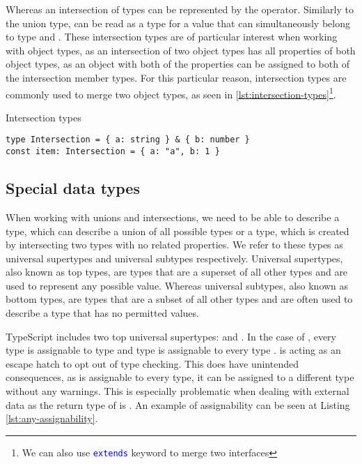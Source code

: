 Whereas an intersection of types can be represented by the \code{&} operator. Similarly to the union type,  can be read as a type for a value that can simultaneously belong to type  and . These intersection types are of particular interest when working with object types, as an intersection of two object types has all properties of both object types, as an object with both of the properties can be assigned to both of the intersection member types. For this particular reason, intersection types are commonly used to merge two object types, as seen in \ref{lst:intersection-types}\footnote{We can also use \texttt{\textcolor{blue}{extends}} keyword to merge two interfaces}.

\begin{listing}[h]
  \caption{Intersection types}\label{lst:intersection-types}
  \begin{verbatim}
type Intersection = { a: string } & { b: number }
const item: Intersection = { a: "a", b: 1 }
  \end{verbatim}
\end{listing}

\subsection{Special data types}

When working with unions and intersections, we need to be able to describe a type, which can describe a union of all possible types or a type, which is created by intersecting two types with no related properties. We refer to these types as universal supertypes and universal subtypes respectively. Universal supertypes, also known as top types, are types that are a superset of all other types and are used to represent any possible value. Whereas universal subtypes, also known as bottom types, are types that are a subset of all other types and are often used to describe a type that has no permitted values.

TypeScript includes two top universal supertypes:  and . In the case of , every type is assignable to type  and type  is assignable to every type \cite{TopTypesAny}.  is acting as an escape hatch to opt out of type checking. This does have unintended consequences, as  is assignable to every type, it can be assigned to a different type without any warnings. This is especially problematic when dealing with external data as the return type of  is . An example of assignability can be seen at Listing \ref{lst:any-assignability}.

